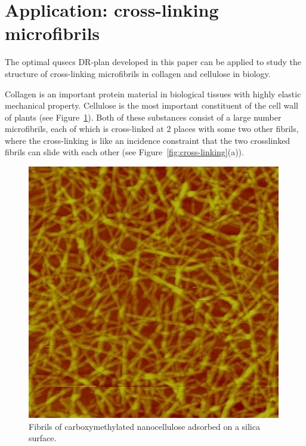 \section{Application: cross-linking microfibrils}

The optimal qusecs DR-plan developed in this paper can be applied to study 
the structure of  cross-linking microfibrils in collagen and cellulose in biology. 

Collagen is an important protein material in biological tissues with highly elastic mechanical property. 
Cellulose is the most important constituent of the cell wall of plants (see Figure~\ref{fig:cellulose}). 
Both of these substances consist of a large number microfibrils,
each of which is cross-linked at 2 places with some two other fibrils, 
where the cross-linking is like an incidence constraint that 
the two crosslinked fibrils can slide with each other (see Figure~\ref{fig:cross-linking}(a)).

%
%
%
%
%
%



\begin{figure}[hbtp]
\centering
\includegraphics[width=0.5\linewidth]{img/AFM_Innventia_nanocellulose}
\caption{Fibrils of carboxymethylated nanocellulose adsorbed on a silica surface. \cite{xxx}}
\label{fig:cellulose}
\end{figure}




